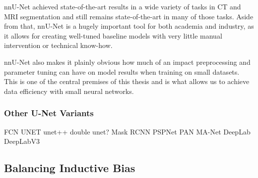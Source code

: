  nnU-Net achieved state-of-the-art results in a wide variety of tasks in CT and MRI segmentation and still remains state-of-the-art in many of those tasks. Aside from that, nnU-Net is a hugely important tool for both academia and industry, as it allows for creating well-tuned baseline models with very little manual intervention or technical know-how.
 
 nnU-Net also makes it plainly obvious how much of an impact preprocessing and parameter tuning can have on model results when training on small datasets. This is one of the central premises of this thesis and is what allows us to achieve data efficiency with small neural networks.
 
 \subsubsection{Other U-Net Variants}

FCN
UNET
unet++
double unet?
Mask RCNN
PSPNet
PAN
MA-Net
DeepLab
DeepLabV3


\subsection{Balancing Inductive Bias}





